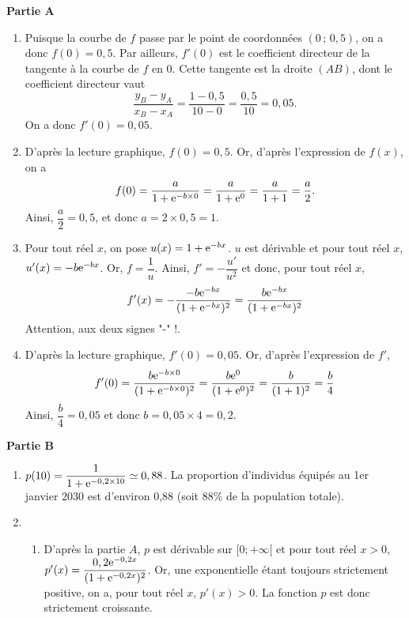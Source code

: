 \documentclass[11pt,fleqn, openany]{book} %
\begin{document}
\begin{solution}\hspace{0pt}

\textbf{Partie A}
\begin{enumerate}
\item  Puisque la courbe de $f$ passe par le point de coordonnées $(0\, ;\, 0,5)$, on a donc $f(0)=0,5$. Par ailleurs, $f'(0)$ est le coefficient directeur de la tangente à la courbe de $f$ en 0. Cette tangente est la droite $(AB)$, dont le coefficient directeur vaut 
\[ \dfrac{y_B-y_A}{x_B-x_A}=\dfrac{1-0,5}{10-0}=\dfrac{0,5}{10}=0,05.\]
On a donc $f'(0)=0,05$.

\item D'après la lecture graphique, $f(0)=0,5$. Or, d'après l'expression de $f(x)$, on a
\[ f(0)= \dfrac{a}{1+\mathrm{e}^{-b \times 0}}=\dfrac{a}{1+\mathrm{e}^0}=\dfrac{a}{1+1}=\dfrac{a}{2}.\]
Ainsi, $\dfrac{a}{2}=0,5$, et donc $a=2\times 0,5 = 1$.

\item Pour tout réel $x$, on pose $u(x)=1+\mathrm{e}^{-bx}$. $u$ est dérivable et pour tout réel $x$, $u'(x)=-b\mathrm{e}^{-bx}$. Or, $f=\dfrac{1}{u}$. Ainsi, $f'=-\dfrac{u'}{u^2}$ et donc, pour tout réel $x$,
\[f'(x)=- \dfrac{-b\mathrm{e}^{-bx}}{(1+\mathrm{e}^{-bx})^2}=\dfrac{b\mathrm{e}^{-bx}}{(1+\mathrm{e}^{-bx})^2}\]
Attention, aux deux signes "-" !.

\item D'après la lecture graphique, $f'(0)=0,05$. Or, d'après l'expression de $f'$, 
\[ f'(0)=\dfrac{b\mathrm{e}^{-b\times 0}}{(1+\mathrm{e}^{-b \times 0})^2}=\dfrac{b\mathrm{e}^0}{(1+\mathrm{e}^0)^2}=\dfrac{b}{(1+1)^2}=\dfrac{b}{4}\]
Ainsi, $\dfrac{b}{4}=0,05$ et donc $b=0,05 \times 4=0,2$.

\end{enumerate}

\textbf{Partie B}	

\begin{enumerate}
\item $p(10)=\dfrac{1}{1+\mathrm{e}^{-0,2 \times 10}}\simeq 0,88$. La proportion d'individus équipés au 1er janvier 2030 est d'environ 0,88 (soit 88\% de la population totale).

\item \begin{enumerate}
\item D'après la partie $A$, $p$ est dérivable sur $[0;+\infty[$ et pour tout réel $x>0$, $p'(x)=\dfrac{0,2\mathrm{e}^{-0,2x}}{(1+\mathrm{e}^{-0,2x})^2}$. Or, une exponentielle étant toujours strictement positive, on a, pour tout réel $x$, $p'(x)>0$. La fonction $p$ est donc strictement croissante.


\end{enumerate}
\end{enumerate}
\end{solution}
\end{document}
